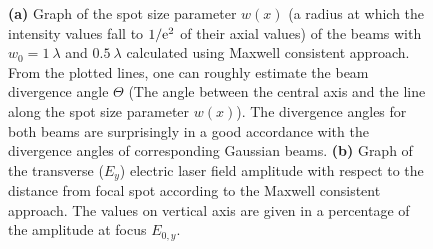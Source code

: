 \begin{figure}[h!]
	\centering
	\hspace{2mm}
	\caption{\textbf{(a)} Graph of the spot size parameter $ w(x) $ (a radius at which the intensity values fall to $ 1/ \mathrm{e}^2 $ of their axial values) of the beams with $ w_0 = 1 \: \lambda $ and $ 0.5 \: \lambda $ calculated using Maxwell consistent approach. From the plotted lines, one can roughly estimate the beam divergence angle $ \Theta $ (The angle between the central axis and the line along the spot size parameter $ w(x) $). The divergence angles for both beams are surprisingly in a good accordance with the divergence angles of corresponding Gaussian beams. \textbf{(b)} Graph of the transverse ($ E_{y} $) electric laser field amplitude with respect to the distance from focal spot according to the Maxwell consistent approach. The values on vertical axis are given in a percentage of the amplitude at focus $ E_{0, y} $.}
	\label{fig:7}
\end{figure}

